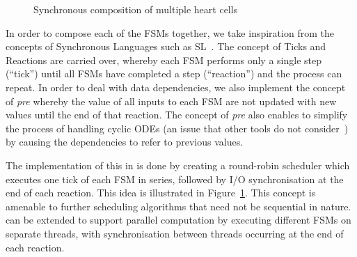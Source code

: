 \begin{figure}
	\centering
	
	\caption{Synchronous composition of multiple heart cells \label{fig:heartCellComposition}}
\end{figure}

In order to compose each of the \acp{FSM} together, we take inspiration from the concepts of Synchronous Languages such as SL~\cite{SlLanguage}.
The concept of Ticks and Reactions are carried over, whereby each \ac{FSM} performs only a single step (``tick'') until all \acp{FSM} have completed a step (``reaction'') and the process can repeat.
In order to deal with data dependencies, we also implement the concept of \emph{pre} whereby the value of all inputs to each \ac{FSM} are not updated with new values until the end of that reaction.
The concept of \emph{pre} also enables \ourTool to simplify the process of handling cyclic \acp{ODE} (an issue that other tools do not consider~\cite{kim2003modular}) by causing the dependencies to refer to previous values.

The implementation of this in \ourTool is done by creating a round-robin scheduler which executes one tick of each \ac{FSM} in series, followed by I/O synchronisation at the end of each reaction.
This idea is illustrated in Figure~\ref{fig:heartCellComposition}.
This concept is amenable to further scheduling algorithms that need not be sequential in nature.
\ourTool can be extended to support parallel computation by executing different \acp{FSM} on separate threads, with synchronisation between threads occurring at the end of each reaction.
